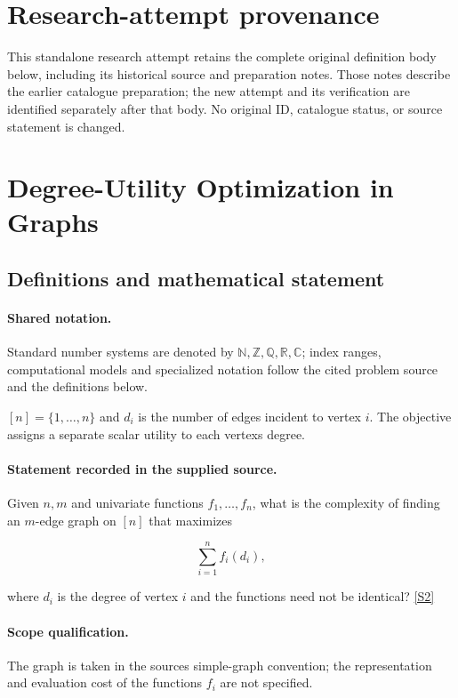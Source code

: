 \documentclass[11pt]{article}
\begin{document}
\section*{Research-attempt provenance}
This standalone research attempt retains the complete original definition body below,
including its historical source and preparation notes. Those notes describe the
earlier catalogue preparation; the new attempt and its verification are identified
separately after that body. No original ID, catalogue status, or source statement is changed.

\section{Degree-Utility Optimization in Graphs}\label{statement}

\subsection{Definitions and mathematical statement}

\paragraph{Shared notation.}Standard number systems are denoted by $\mathbb N,\mathbb Z,\mathbb Q,\mathbb R,\mathbb C$; index ranges, computational models and specialized notation follow the cited problem source and the definitions below.


$[n]=\{1,\ldots,n\}$ and $d_i$ is the number of edges incident to vertex $i$. The objective assigns a separate scalar utility to each vertex\textquotesingle s degree.
\paragraph{Statement recorded in the supplied source.}
Given $n,m$ and univariate functions $f_1,\ldots,f_n$, what is the complexity of finding an $m$-edge graph on $[n]$ that maximizes

$$\sum_{i=1}^nf_i(d_i),$$

where $d_i$ is the degree of vertex $i$ and the functions need not be identical? \href{https://doi.org/10.4171/owr/2018/50}{[S2]}
\paragraph{Scope qualification.}
The graph is taken in the source\textquotesingle s simple-graph convention; the representation and evaluation cost of the functions $f_i$ are not specified.
\end{document}
